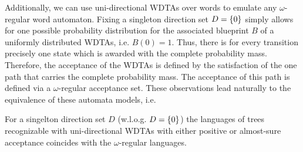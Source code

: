Additionally, we can use uni-directional \acp{WDTA} over words to emulate any 
$\omega$-regular word automaton. Fixing a singleton direction set $D = \left\{0\right\}$ 
simply allows for one possible probability distribution for the associated 
blueprint $B$ of a uniformly distributed \acp{WDTA}, i.e.  $B(0) = 1$. Thus, 
there is for every transition precisely one state which is awarded with the 
complete probability mass. 
Therefore, the acceptance of the \acp{WDTA} is defined by the satisfaction of
the one path that carries the complete probability mass. The acceptance of this
path is defined via a $\omega$-regular acceptance set. These observations lead
naturally to the equivalence of these automata models, i.e.
\begin{theorem}
  For a singelton direction set $D$ (w.l.o.g. $D = \left\{0\right\}$) the languages of
  trees recognizable with uni-directional \acp{WDTA} with either positive 
  or almost-sure acceptance coincides with the $\omega$-regular languages.
\end{theorem}
